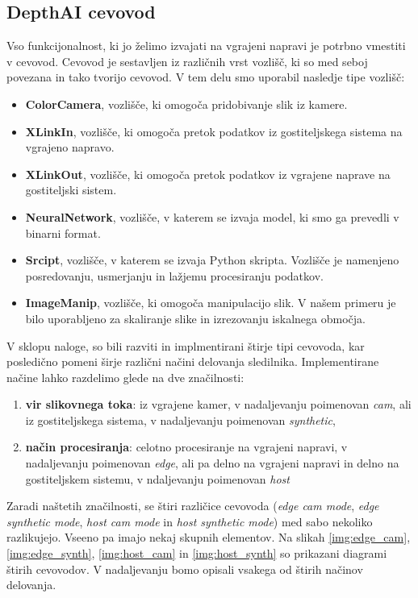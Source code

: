 \documentclass[a4paper,12pt,openright]{book}
\begin{document}
\subsection{DepthAI cevovod}
\label{sec:pipeline}
Vso funkcijonalnost, ki jo želimo izvajati na vgrajeni napravi je potrbno vmestiti v cevovod. Cevovod je sestavljen iz različnih vrst vozlišč, ki so med seboj povezana in tako tvorijo cevovod. V tem delu smo uporabil nasledje tipe vozlišč:

\begin{itemize}
    \item \textbf{ColorCamera}, vozlišče, ki omogoča pridobivanje slik iz kamere.
    \item \textbf{XLinkIn}, vozlišče, ki omogoča pretok podatkov iz gostiteljskega sistema na vgrajeno napravo.
    \item \textbf{XLinkOut}, vozlišče, ki omogoča pretok podatkov iz vgrajene naprave na gostiteljski sistem.
    \item \textbf{NeuralNetwork}, vozlišče, v katerem se izvaja model, ki smo ga prevedli v binarni format.
    \item \textbf{Srcipt}, vozlišče, v katerem se izvaja Python skripta. Vozlišče je namenjeno posredovanju, usmerjanju in lažjemu procesiranju podatkov.
    \item \textbf{ImageManip}, vozlišče, ki omogoča manipulacijo slik. V našem primeru je bilo uporabljeno za skaliranje slike in izrezovanju iskalnega območja.
\end{itemize}


V sklopu naloge, so bili razviti in implmentirani štirje tipi cevovoda, kar posledično pomeni širje različni načini delovanja sledilnika. Implementirane načine lahko razdelimo glede na dve značilnosti:

\begin{enumerate}
    \item \textbf{vir slikovnega toka}: iz vgrajene kamer, v nadaljevanju poimenovan \emph{cam}, ali iz gostiteljskega sistema, v nadaljevanju poimenovan \emph{synthetic},
    \item \textbf{način procesiranja}: celotno procesiranje na vgrajeni napravi, v nadaljevanju poimenovan \emph{edge}, ali pa delno na vgrajeni napravi in delno na gostiteljskem sistemu, v ndaljevanju poimenovan \emph{host}
\end{enumerate}

Zaradi naštetih značilnosti, se štiri različice cevovoda (\emph{edge cam mode}, \emph{edge synthetic mode}, \emph{host cam mode} in \emph{host synthetic mode}) med sabo nekoliko razlikujejo. Vseeno pa imajo nekaj skupnih elementov. Na slikah \ref{img:edge_cam}, \ref{img:edge_synth}, \ref{img:host_cam} in \ref{img:host_synth} so prikazani diagrami štirih cevovodov. V nadaljevanju bomo opisali vsakega od štirih načinov delovanja.
\end{document}
